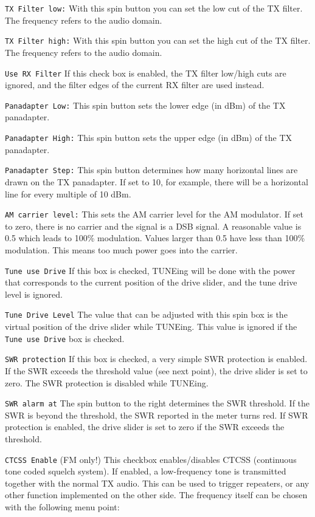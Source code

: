 \documentclass[12pt]{book}
\def\rett#1{\texttt{\color{red}#1}}
\begin{document}
\rett{TX Filter low:} With this spin button you can set the low cut of the TX filter. The
frequency refers to the audio domain.

\rett{TX Filter high:} With this spin button you can set the high cut of the TX filter. The
frequency refers to the audio domain.

\rett{Use RX Filter} If this check box is enabled, the TX filter low/high cuts are ignored,
and the filter edges of the current RX filter are used instead.

\rett{Panadapter Low:} This spin button sets the lower edge (in dBm) of the TX panadapter.

\rett{Panadapter High:} This spin button sets the upper edge (in dBm) of the TX panadapter.

\rett{Panadapter Step:} This spin button determines how many horizontal lines are drawn on the
TX panadapter. If set to 10, for example, there will be a horizontal line for every multiple
of 10 dBm.

\rett{AM carrier level:} This sets the AM carrier level for the AM modulator. If set to zero, there is no 
carrier and the
signal is a DSB signal. A reasonable value is 0.5 which leads to 100\% modulation. Values larger than
0.5 have less than 100\% modulation. This means too much power goes into the carrier.

\rett{Tune use Drive} If this box is checked, TUNEing will be done with the power that corresponds to the
current position of the drive slider, and the tune drive level is ignored.

\rett{Tune Drive Level} The value that can be adjusted with this spin box is the virtual position of the 
drive slider while TUNEing. This value is ignored if the \rett{Tune use Drive} box is checked.

\rett{SWR protection} If this box is checked, a very simple SWR protection is enabled. If the SWR exceeds 
the threshold value (see next point), the drive slider is set to zero. The SWR protection is disabled
while TUNEing.

\rett{SWR alarm at} The spin button to the right determines the SWR threshold. If the SWR is beyond the 
threshold, the SWR reported in the meter turns red. If SWR protection is enabled, the drive slider is set to 
zero if the SWR exceeds the threshold.

\rett{CTCSS Enable} (FM only!) This checkbox enables/disables CTCSS (continuous tone coded squelch system). 
If enabled, a low-frequency
tone is transmitted together with the normal TX audio. This can be used to trigger repeaters, or any other 
function implemented
on the other side. The frequency itself can be chosen with the following menu point:
\end{document}
